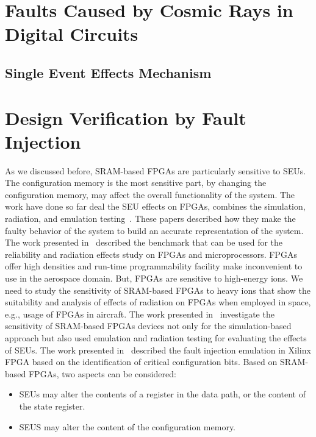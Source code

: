 \section{Faults Caused by Cosmic Rays in Digital Circuits}
\subsection{Single Event Effects Mechanism}


\section{Design Verification by Fault Injection}



As we discussed before, SRAM-based FPGAs are particularly sensitive to SEUs. The configuration memory is the most sensitive part, by changing the configuration memory, may affect the overall functionality of the system. The work have done so far deal the SEU effects on FPGAs, combines the simulation, radiation, and emulation testing~\cite{quinn2015validation, violante2004simulation, hobeika2014multi, robache2013methodology, quinn2015using, souari2015optimization}. These papers described how they make the faulty behavior of the system to build an accurate representation of the system. The work presented in~\cite{quinn2015using} described the benchmark that can be used for the reliability and radiation effects study on FPGAs and microprocessors. FPGAs offer high densities and run-time programmability facility make inconvenient to use in the aerospace domain. But, FPGAs are sensitive to high-energy ions.  We need to study the sensitivity of SRAM-based FPGAs to heavy ions that show the suitability and analysis of effects of radiation on FPGAs when employed in space, e.g., usage of FPGAs in aircraft. The work presented in~\cite{hobeika2014multi} investigate the sensitivity of SRAM-based FPGAs devices not only for the simulation-based approach but also used emulation and radiation testing for evaluating the effects of SEUs. The work presented in~\cite{souari2015optimization} described the fault injection emulation in Xilinx FPGA based on the identification of critical configuration bits. Based on SRAM-based FPGAs, two aspects can be considered:

\begin{itemize}


\item SEUs may alter the contents of a register in the data path, or the content of the state register.
\item SEUS may alter the content of the configuration memory.

\end{itemize}



